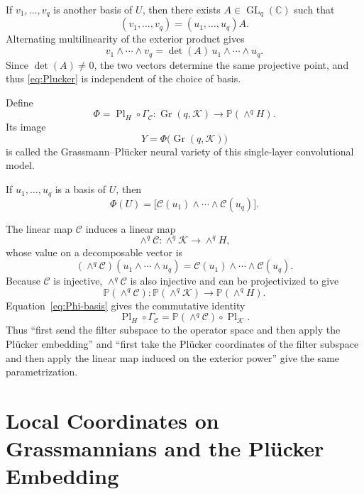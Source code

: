 \documentclass{siamonline250211}
\newcommand{\CC}{\mathbb C}
\newcommand{\PP}{\mathbb P}
\newcommand{\Gr}{\operatorname{Gr}}
\newcommand{\Pl}{\operatorname{Pl}}
\newcommand{\cK}{\mathcal K}
\newcommand{\cC}{\mathcal C}
\begin{document}
If $v_1,\ldots,v_q$ is another basis of $U$, then there exists
$A\in\operatorname{GL}_q(\CC)$ such that
\[
  (v_1,\ldots,v_q)=(u_1,\ldots,u_q)A.
\]
Alternating multilinearity of the exterior product gives
\[
  v_1\wedge\cdots\wedge v_q
  =\det(A)\,u_1\wedge\cdots\wedge u_q.
\]
Since $\det(A)\neq0$, the two vectors determine the same projective point, and
thus \eqref{eq:Plucker} is independent of the choice of basis.

\begin{definition}
\label{def:Phi}
Define
\begin{equation}\label{eq:Phi}
  \Phi=\Pl_H\circ\Gamma_{\cC}:
  \Gr(q,\cK)\longrightarrow\PP(\wedge^qH).
\end{equation}
Its image
\begin{equation}\label{eq:Y}
  Y=\Phi\bigl(\Gr(q,\cK)\bigr)
\end{equation}
is called the Grassmann--Pl\"ucker neural variety of this single-layer
convolutional model.
\end{definition}

If $u_1,\ldots,u_q$ is a basis of $U$, then
\begin{equation}\label{eq:Phi-basis}
  \Phi(U)
  =\bigl[\cC(u_1)\wedge\cdots\wedge\cC(u_q)\bigr].
\end{equation}

The linear map $\cC$ induces a linear map
\[
  \wedge^q\cC:\wedge^q\cK\longrightarrow\wedge^qH,
\]
whose value on a decomposable vector is
\[
  (\wedge^q\cC)(u_1\wedge\cdots\wedge u_q)
  =\cC(u_1)\wedge\cdots\wedge\cC(u_q).
\]
Because $\cC$ is injective, $\wedge^q\cC$ is also injective and can be
projectivized to give
\[
  \PP(\wedge^q\cC):
  \PP(\wedge^q\cK)\longrightarrow\PP(\wedge^qH).
\]
Equation~\eqref{eq:Phi-basis} gives the commutative identity
\begin{equation}\label{eq:commuting-identity}
  \boxed{
  \Pl_H\circ\Gamma_{\cC}
  =\PP(\wedge^q\cC)\circ\Pl_{\cK}.}
\end{equation}
Thus ``first send the filter subspace to the operator space and then apply the
Pl\"ucker embedding'' and ``first take the Pl\"ucker coordinates of the filter
subspace and then apply the linear map induced on the exterior power'' give the
same parametrization.

\section{Local Coordinates on Grassmannians and the Pl\texorpdfstring{\"u}{u}cker Embedding}
\end{document}
